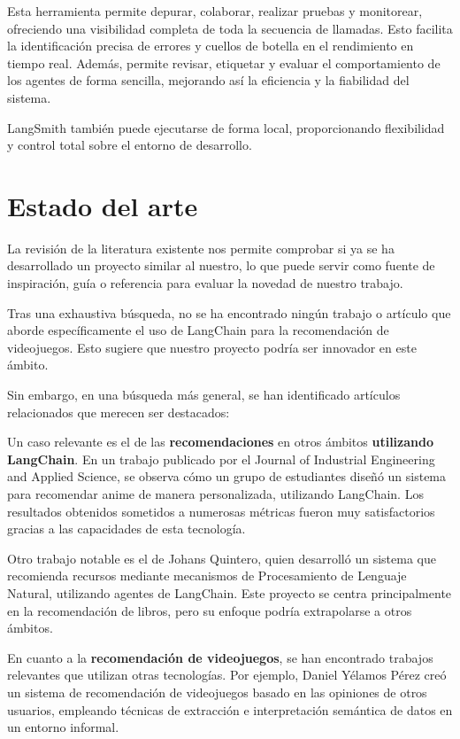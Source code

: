 Esta herramienta permite depurar, colaborar, realizar pruebas y monitorear, ofreciendo una visibilidad completa de toda la secuencia de llamadas. Esto facilita la identificación precisa de errores y cuellos de botella en el rendimiento en tiempo real. Además, permite revisar, etiquetar y evaluar el comportamiento de los agentes de forma sencilla, mejorando así la eficiencia y la fiabilidad del sistema.  

LangSmith también puede ejecutarse de forma local, proporcionando flexibilidad y control total sobre el entorno de desarrollo.  \cite{PaginaLangChainOficialLangSmith} \cite{mavroudis2024langchain}

\newpage
\section{Estado del arte}

La revisión de la literatura existente nos permite comprobar si ya se ha desarrollado un proyecto similar al nuestro, lo que puede servir como fuente de inspiración, guía o referencia para evaluar la novedad de nuestro trabajo.

Tras una exhaustiva búsqueda, no se ha encontrado ningún trabajo o artículo que aborde específicamente el uso de LangChain para la recomendación de videojuegos. Esto sugiere que nuestro proyecto podría ser innovador en este ámbito.

Sin embargo, en una búsqueda más general, se han identificado artículos relacionados que merecen ser destacados:

Un caso relevante es el de las \textbf{recomendaciones} en otros ámbitos \textbf{utilizando LangChain}. En un trabajo publicado por el Journal of Industrial Engineering and Applied Science, se observa cómo un grupo de estudiantes diseñó un sistema para recomendar anime de manera personalizada, utilizando LangChain. Los resultados obtenidos sometidos a numerosas métricas fueron muy satisfactorios gracias a las capacidades de esta tecnología. \cite{zhang2024unlocking}

Otro trabajo notable es el de Johans Quintero, quien desarrolló un sistema que recomienda recursos mediante mecanismos de Procesamiento de Lenguaje Natural, utilizando agentes de LangChain. Este proyecto se centra principalmente en la recomendación de libros, pero su enfoque podría extrapolarse a otros ámbitos. \cite{recommender-agent-langchain}

En cuanto a la \textbf{recomendación de videojuegos}, se han encontrado trabajos relevantes que utilizan otras tecnologías. Por ejemplo, Daniel Yélamos Pérez creó un sistema de recomendación de videojuegos basado en las opiniones de otros usuarios, empleando técnicas de extracción e interpretación semántica de datos en un entorno informal. \cite{yelamos2016recomendacion}

